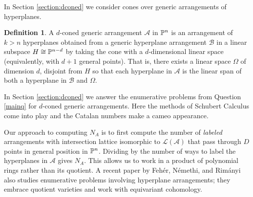 \documentclass[12pt]{article}
\theoremstyle{plain}
\theoremstyle{definition}
\newtheorem{definition}[theorem]{Definition}
\newcommand{\A}{\mathcal{A}}
\newcommand{\N}{N}
\renewcommand{\L}{\mathcal{L}}
\renewcommand{\P}{\ensuremath \mathbb{P}}
\begin{document}
In Section \ref{section:dconed} we consider cones over generic arrangements of
hyperplanes. 

\begin{definition} \label{dconed} A $d$-coned generic arrangement $\A$
  in $\P^n$ is an arrangement of $k > n$ hyperplanes obtained from a
  generic hyperplane arrangement $\mathcal{B}$ in a linear subspace $H
  \cong \P^{n-d}$ by taking the cone with a $d$-dimensional linear
  space (equivalently, with $d+1$ general points). That is, there
  exists a linear space $\Omega$ of dimension $d$, disjoint from $H$
  so that each hyperplane in $\A$ is the linear span of both a
  hyperplane in $\mathcal{B}$ and $\Omega$. \end{definition}

In Section \ref{section:dconed} we answer the enumerative problems from Question
\ref{mainq} for $d$-coned generic arrangements. Here the methods of
Schubert Calculus come into play and the Catalan numbers make a cameo
appearance.


Our approach to computing $\N_A$ is to first compute the number of
{\em labeled} arrangements with intersection lattice isomorphic to $\L(\A)$
that pass through $D$ points in general position in $\P^n$. Dividing by
the number of ways to label the hyperplanes in $\A$ gives $\N_A$. This
allows us to work in a product of polynomial rings rather than its
quotient. A recent paper by Feh{\'e}r, N{\'e}methi, and Rim{\'a}nyi
\cite{Rimanyi} also studies enumerative problems involving hyperplane
arrangements; they embrace quotient varieties and work with equivariant
cohomology. 
\end{document}
